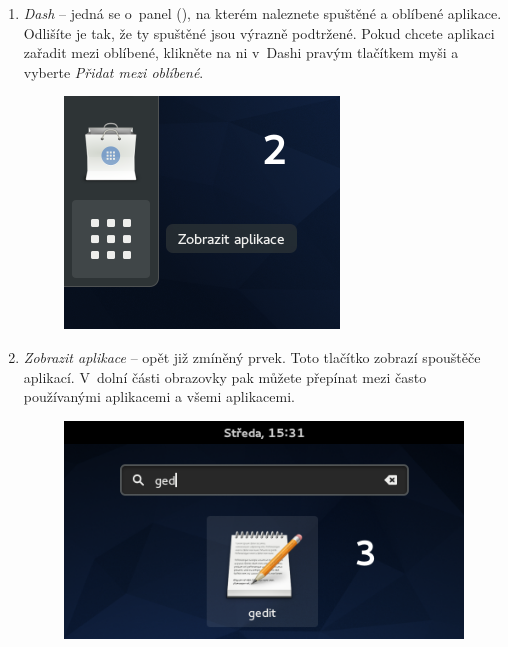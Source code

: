 \begin{enumerate}
\item \emph{Dash} -- jedná se o~panel (), na kterém naleznete spuštěné a oblíbené aplikace. Odlišíte je tak, že ty spuštěné jsou výrazně podtržené. Pokud chcete aplikaci zařadit mezi oblíbené, klikněte na ni v~Dashi pravým tlačítkem myši a vyberte \emph{Přidat mezi oblíbené}.

\begin{figure}[t]
\begin{center}
\includegraphics[width=\textwidth]{img/dash-a}
 \label{fig:dash-a}
\end{center}
\end{figure}

\item \emph{Zobrazit aplikace} -- opět již zmíněný prvek. Toto tlačítko zobrazí spouštěče aplikací. V~dolní části obrazovky pak můžete přepínat mezi často používanými aplikacemi a všemi aplikacemi.

\begin{figure}[t]
\begin{center}
\includegraphics[width=\textwidth]{img/vyhledavani}
 \label{fig:vyhledavani}
\end{center}
\end{figure}


\end{enumerate}
